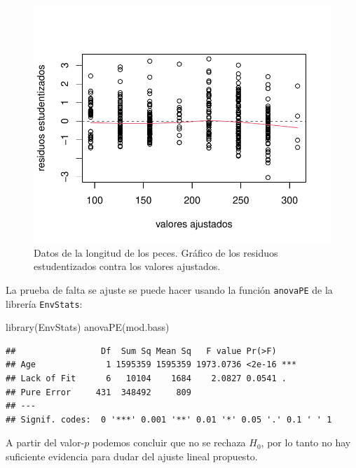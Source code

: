 \documentclass[
]{article}
\newenvironment{Shaded}{\begin{snugshade}}{\end{snugshade}}
\newcommand{\FunctionTok}[1]{\textcolor[rgb]{0.00,0.00,0.00}{#1}}
\newcommand{\NormalTok}[1]{#1}
\begin{document}
\begin{figure}

{\centering \includegraphics{MLGI_files/figure-latex/pecesResiduos1-1} 

}

\caption{Datos de la longitud de los peces. Gráfico de los residuos estudentizados contra los valores ajustados.}\label{fig:pecesResiduos1}
\end{figure}

La prueba de falta se ajuste se puede hacer usando la función \texttt{anovaPE} de la librería \texttt{EnvStats}:

\begin{Shaded}
\begin{Highlighting}[]
\FunctionTok{library}\NormalTok{(EnvStats)}
\FunctionTok{anovaPE}\NormalTok{(mod.bass)}
\end{Highlighting}
\end{Shaded}

\begin{verbatim}
##                 Df  Sum Sq Mean Sq   F value Pr(>F)    
## Age              1 1595359 1595359 1973.0736 <2e-16 ***
## Lack of Fit      6   10104    1684    2.0827 0.0541 .  
## Pure Error     431  348492     809                     
## ---
## Signif. codes:  0 '***' 0.001 '**' 0.01 '*' 0.05 '.' 0.1 ' ' 1
\end{verbatim}

A partir del valor-\(p\) podemos concluir que no se rechaza \(H_{0}\), por lo tanto no hay suficiente evidencia para dudar del ajuste lineal propuesto.
\end{document}
